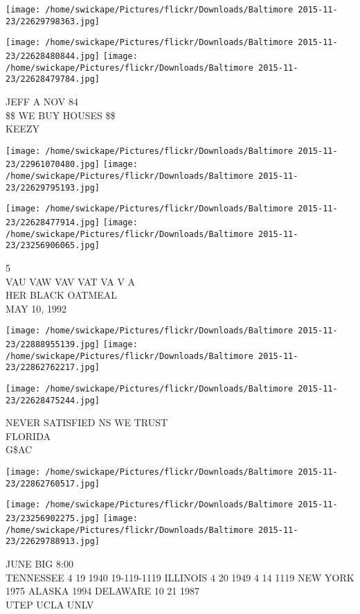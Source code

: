\documentclass[10pt,letterpaper]{article}
\begin{document}
\texttt{[image: /home/swickape/Pictures/flickr/Downloads/Baltimore 2015-11-23/22629798363.jpg]}

\vspace{0.25in}
\texttt{[image: /home/swickape/Pictures/flickr/Downloads/Baltimore 2015-11-23/22628480844.jpg]}
\texttt{[image: /home/swickape/Pictures/flickr/Downloads/Baltimore 2015-11-23/22628479784.jpg]}

JEFF A NOV 84\\
\$\$ WE BUY HOUSES \$\$\\
KEEZY
\pagebreak

\texttt{[image: /home/swickape/Pictures/flickr/Downloads/Baltimore 2015-11-23/22961070480.jpg]}
\texttt{[image: /home/swickape/Pictures/flickr/Downloads/Baltimore 2015-11-23/22629795193.jpg]}

\texttt{[image: /home/swickape/Pictures/flickr/Downloads/Baltimore 2015-11-23/22628477914.jpg]}
\texttt{[image: /home/swickape/Pictures/flickr/Downloads/Baltimore 2015-11-23/23256906065.jpg]}

5\\
VAU VAW VAV VAT VA V A\\
HER BLACK OATMEAL\\
MAY 10, 1992
\pagebreak

\texttt{[image: /home/swickape/Pictures/flickr/Downloads/Baltimore 2015-11-23/22888955139.jpg]}
\texttt{[image: /home/swickape/Pictures/flickr/Downloads/Baltimore 2015-11-23/22862762217.jpg]}

\texttt{[image: /home/swickape/Pictures/flickr/Downloads/Baltimore 2015-11-23/22628475244.jpg]}

NEVER SATISFIED NS WE TRUST\\
FLORIDA\\
G\$AC
\pagebreak

\texttt{[image: /home/swickape/Pictures/flickr/Downloads/Baltimore 2015-11-23/22862760517.jpg]}

\vspace{0.25in}
\texttt{[image: /home/swickape/Pictures/flickr/Downloads/Baltimore 2015-11-23/23256902275.jpg]}
\texttt{[image: /home/swickape/Pictures/flickr/Downloads/Baltimore 2015-11-23/22629788913.jpg]}

JUNE BIG 8:00\\
TENNESSEE 4 19 1940 19{-}119{-}1119 ILLINOIS 4 20 1949 4 14 1119 NEW YORK 1975 ALASKA 1994 DELAWARE 10 21 1987\\
UTEP UCLA UNLV
\pagebreak
\end{document}
